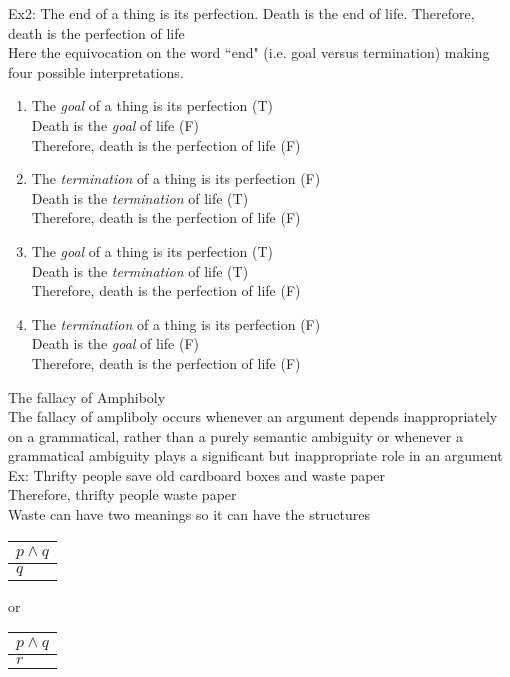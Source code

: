 Ex2: The end of a thing is its perfection. Death is the end of life. Therefore, death is the perfection of life\\
Here the equivocation on the word ``end" (i.e. goal versus termination) making four possible interpretations.
\begin{enumerate}
    \item The \textit{goal} of a thing is its perfection (T)\\
    Death is the \textit{goal} of life (F)\\
    Therefore, death is the perfection of life (F)
    \item The \textit{termination} of a thing is its perfection (F)\\
    Death is the \textit{termination} of life (T)\\
    Therefore, death is the perfection of life (F)
    \item The \textit{goal} of a thing is its perfection (T)\\
    Death is the \textit{termination} of life (T)\\
    Therefore, death is the perfection of life (F)
    \item The \textit{termination} of a thing is its perfection (F)\\
    Death is the \textit{goal} of life (F)\\
    Therefore, death is the perfection of life (F)
\end{enumerate}
The fallacy of Amphiboly\\
The fallacy of ampliboly occurs whenever an argument depends inappropriately on a grammatical, rather than a purely semantic ambiguity or whenever a grammatical ambiguity plays a significant but inappropriate role in an argument\\

Ex: Thrifty people save old cardboard boxes and waste paper\\
Therefore, thrifty people waste paper\\
Waste can have two meanings so it can have the structures\\
\begin{tabular}{p{1cm}}
    $p\wedge q$\\
    \hline
    $q$
\end{tabular} or \begin{tabular}{p{1cm}}
    $p\wedge q$\\
    \hline
    $r$
\end{tabular}